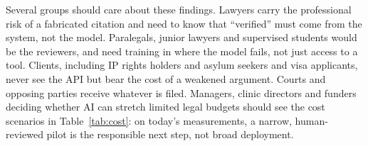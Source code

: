\documentclass[10pt,letterpaper]{article}
\begin{document}
Several groups should care about these findings. Lawyers carry the professional risk of a fabricated citation and need to know that ``verified'' must come from the system, not the model. Paralegals, junior lawyers and supervised students would be the reviewers, and need training in where the model fails, not just access to a tool. Clients, including IP rights holders and asylum seekers and visa applicants, never see the API but bear the cost of a weakened argument. Courts and opposing parties receive whatever is filed. Managers, clinic directors and funders deciding whether AI can stretch limited legal budgets should see the cost scenarios in Table~\ref{tab:cost}: on today's measurements, a narrow, human-reviewed pilot is the responsible next step, not broad deployment.

\small
\end{document}
